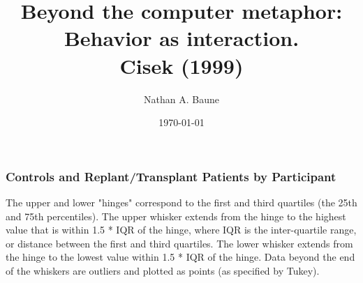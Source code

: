 \documentclass{beamer}
\title[Cisek (1999)]{Beyond the computer metaphor:\\ Behavior as interaction.\\Cisek (1999)} %
\author{Nathan A. Baune} %
\institute[UM] %
{
  University of Missouri-Columbia   \\   %
  \medskip
   \textit{} %
}
\date{\today} %
\begin{document}



\section{}

\begin{frame}
\frametitle{Controls and Replant/Transplant Patients by Participant}
\begin{figure}
\setlength{\fboxsep}{0pt}%
\setlength{\fboxrule}{1pt}%
\end{figure}
\tiny
The upper and lower "hinges" correspond to the first and third quartiles (the 25th and 75th percentiles). The upper whisker extends from the hinge to the highest value that is within 1.5 * IQR of the hinge, where IQR is the inter-quartile range, or distance between the first and third quartiles. The lower whisker extends from the hinge to the lowest value within 1.5 * IQR of the hinge. Data beyond the end of the whiskers are outliers and plotted as points (as specified by Tukey).
\end{frame}
\end{document}
